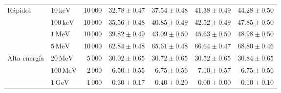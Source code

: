 \begin{tabular}{llrrrrr}
\midrule
Rápidos & $10\,\mathrm{keV}$ & 10\,000 & $32.78\pm0.47$ & $37.54\pm0.48$ & $41.38\pm0.49$ & $44.28\pm0.50$ \\
 & $100\,\mathrm{keV}$ & 10\,000 & $35.56\pm0.48$ & $40.85\pm0.49$ & $42.52\pm0.49$ & $47.85\pm0.50$ \\
 & $1\,\mathrm{MeV}$ & 10\,000 & $39.82\pm0.49$ & $43.09\pm0.50$ & $45.63\pm0.50$ & $48.98\pm0.50$ \\
 & $5\,\mathrm{MeV}$ & 10\,000 & $62.84\pm0.48$ & $65.61\pm0.48$ & $66.64\pm0.47$ & $68.80\pm0.46$ \\
\midrule
Alta energía & $20\,\mathrm{MeV}$ & 5\,000 & $30.02\pm0.65$ & $30.72\pm0.65$ & $30.52\pm0.65$ & $30.84\pm0.65$ \\
 & $100\,\mathrm{MeV}$ & 2\,000 & $6.50\pm0.55$ & $6.75\pm0.56$ & $7.10\pm0.57$ & $6.75\pm0.56$ \\
 & $1\,\mathrm{GeV}$ & 1\,000 & $0.30\pm0.17$ & $0.40\pm0.20$ & $0.00\pm0.00$ & $0.10\pm0.10$ \\
\bottomrule
\end{tabular}
